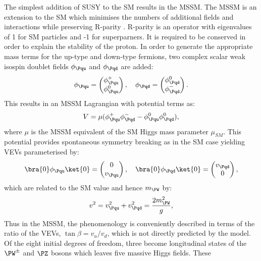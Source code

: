 The simplest addition of SUSY to the \ac{SM} results in the \ac{MSSM}. The
\ac{MSSM} is an extension to the \ac{SM} which minimises the numbers of
additional fields and interactions while preserving R-parity \cite{Dimopoulos:1981zb}. R-parity
is an operator with eigenvalues of 1 for \ac{SM} particles and -1 for
superparners. It is required to be conserved in order to explain the stability
of the proton. In order to generate the appropriate mass terms for the up-type 
and down-type fermions, two complex scalar weak isospin doublet fields
$\phi_{\Pqu}$ and $\phi_{\Pqd}$ are added:
\begin{equation}
\phi_{\Pqu} = \begin{pmatrix}\phi_{\Pqu}^{+} \\ \phi_{\Pqu}^{0} \end{pmatrix}, \quad
\phi_{\Pqd} = \begin{pmatrix}\phi_{\Pqd}^{0} \\ \phi_{\Pqd}^{-} \end{pmatrix}. 
\end{equation}
This results in an \ac{MSSM} Lagrangian with potential terms as:
\begin{equation}
V=\mu(\phi_{\Pqu}^{+}\phi_{\Pqd}^{-} - \phi_{\Pqu}^{0}\phi_{\Pqd}^{0}),
\end{equation}
where $\mu$ is the \ac{MSSM} equivalent of the \ac{SM} Higgs mass parameter
$\mu_{SM}$. This potential provides spontaneous symmetry breaking as in the
\ac{SM} case yielding VEVs parameterised by:
\begin{equation}
\bra{0}\phi_{\Pqu}\ket{0} = \begin{pmatrix} 0 \\ v_{\Pqu}  \end{pmatrix}, \quad
\bra{0}\phi_{\Pqd}\ket{0} = \begin{pmatrix} v_{\Pqd} \\ 0 \end{pmatrix},
\end{equation}
which are related to the \ac{SM} value and hence $m_{\PW}$ by: 
\begin{equation}
v^{2} = v_{\Pqu}^{2} +  v_{\Pqd}^{2} =  \frac{2m_{\PW}^{2}}{g},
\end{equation}
Thus in the \ac{MSSM}, the
phenomenology is conveniently described in terms of the ratio of the VEVs,
$\tan\beta = v_{u}/v_{d}$, which is not directly predicted by the model.
Of the eight initial degrees of freedom, three become longitudinal states of the
$\PW^{\pm}$ and $\PZ$ bosons which leaves five massive Higgs fields. These
